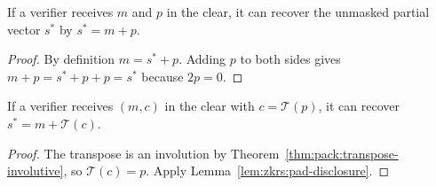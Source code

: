 \begin{lemma}\label{lem:zkrs:pad-disclosure}
If a verifier receives $m$ and $p$
in the clear, it can recover the
unmasked partial vector $s^*$ by
$s^*=m+p$.
\end{lemma}
\begin{proof}
By definition $m=s^*+p$.
Adding $p$ to both sides gives
$m+p=s^*+p+p=s^*$ because $2p=0$.
\end{proof}

\begin{corollary}\label{cor:zkrs:c-disclosure}
If a verifier receives $(m,c)$ in the clear
with $c=\mathcal T(p)$, it can recover
$s^*=m+\mathcal T(c)$.
\end{corollary}
\begin{proof}
The transpose is an involution by
Theorem~\ref{thm:pack:transpose-involutive},
so $\mathcal T(c)=p$.
Apply Lemma~\ref{lem:zkrs:pad-disclosure}.
\end{proof}
